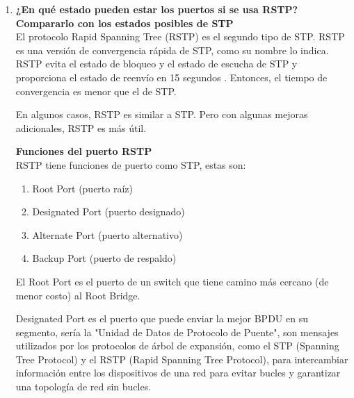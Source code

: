 \documentclass[a4paper]{article}
\begin{document}
\begin{enumerate}
\begin{enumerate}
\begin{lstlisting}
		[admin@2003] /interface bridge> monitor
		numbers: bridge2003
		state: enabled
		current-mac-address: 0C:C6:FE:93:0D:00
		root-bridge: no
		root-bridge-id: 0x8000.0C:C6:FE:23:EF:00
		root-path-cost: 20
		root-port: ether3
		port-count: 3
		designated-port-count: 1
	\end{lstlisting}
	\item  \textbf{¿Cuál bridge resultó ser el seleccionado para romper el
loop?
	}
    El bridge del Router 2003, tiene un puerto que dice alternate-port, ether2 y como root-port esta ether3.
    

\end{enumerate}
\item \textbf{¿En qué estado pueden estar los puertos si se usa RSTP?
	Compararlo con los estados posibles de STP
}
\\
El protocolo Rapid Spanning Tree (RSTP) es el segundo tipo de STP. RSTP es una versión de convergencia rápida de STP, como su nombre lo indica. RSTP evita el estado de bloqueo y el estado de escucha de STP y proporciona el estado de reenvío en 15 segundos . Entonces, el tiempo de convergencia es menor que el de STP.

En algunos casos, RSTP es similar a STP. Pero con algunas mejoras adicionales, RSTP es más útil. 

\textbf{Funciones del puerto RSTP}
\\
RSTP tiene funciones de puerto como STP, estas son:

\begin{enumerate}
\item Root Port (puerto raíz)
\item Designated Port (puerto designado)
\item Alternate Port (puerto alternativo)
\item Backup Port (puerto de respaldo)

\end{enumerate}

El Root Port es el puerto de un switch que tiene camino más cercano (de menor costo) al Root Bridge.

Designated Port es el puerto que puede enviar la mejor BPDU en su segmento, sería la  "Unidad de Datos de Protocolo de Puente", son mensajes utilizados por los protocolos de árbol de expansión, como el STP (Spanning Tree Protocol) y el RSTP (Rapid Spanning Tree Protocol), para intercambiar información entre los dispositivos de una red para evitar bucles y garantizar una topología de red sin bucles.


\end{enumerate}
\end{document}
